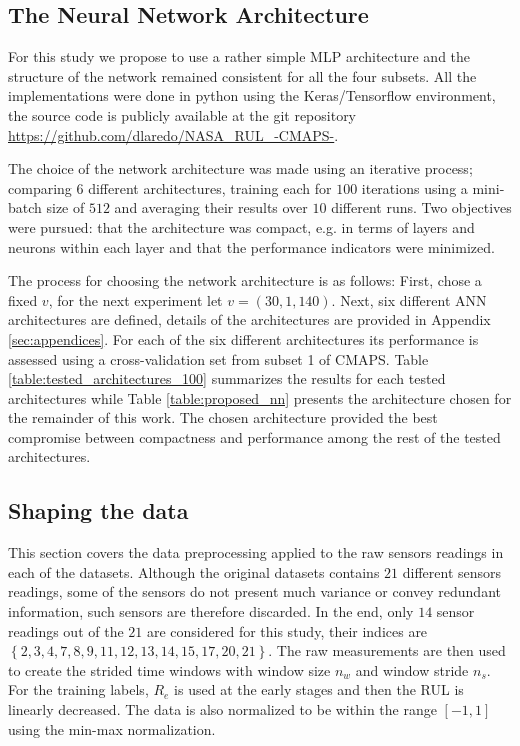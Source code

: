 \documentclass[12pt]{IEEEtran}%
\begin{document}
\subsection{The Neural Network Architecture}

For this study we propose to use a rather simple MLP architecture and the
structure of the network remained consistent for all the four subsets. All the
implementations were done in python using the Keras/Tensorflow environment,
the source code is publicly available at the git repository \url{https://github.com/dlaredo/NASA_RUL_-CMAPS-}.

The choice of the network architecture was made using an iterative process;
comparing 6 different architectures, training each for $100$ iterations using
a mini-batch size of $512$ and averaging their results over $10$ different
runs. Two objectives were pursued: that the architecture was compact, e.g. in
terms of layers and neurons within each layer and that the performance
indicators were minimized.

The process for choosing the network architecture is as follows: First, chose
a fixed $v$, for the next experiment let $v= (30, 1, 140)$. Next, six
different ANN architectures are defined, details of the architectures are
provided in Appendix \ref{sec:appendices}. For each of the six different
architectures its performance is assessed using a cross-validation set from
subset 1 of CMAPS. Table \ref{table:tested_architectures_100} summarizes the
results for each tested architectures while Table \ref{table:proposed_nn}
presents the architecture chosen for the remainder of this work. The chosen
architecture provided the best compromise between compactness and performance
among the rest of the tested architectures.


\subsection{Shaping the data}

This section covers the data preprocessing applied to the raw sensors readings
in each of the datasets. Although the original datasets contains $21$
different sensors readings, some of the sensors do not present much variance
or convey redundant information, such sensors are therefore discarded. In the
end, only $14$ sensor readings out of the $21$ are considered for this study,
their indices are $\left\lbrace 2, 3, 4, 7, 8, 9, 11, 12, 13, 14, 15, 17, 20,
21 \right\rbrace $. The raw measurements are then used to create the strided
time windows with window size $n_{w}$ and window stride $n_{s}$. For the
training labels, $R_{e}$ is used at the early stages and then the RUL is
linearly decreased. The data is also normalized to be within the range
$\left[  -1,1 \right]  $ using the min-max normalization.%
\end{document}

